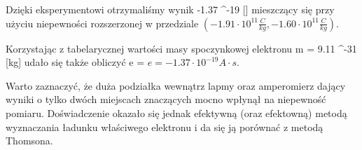 \documentclass{article}
\begin{document}
Dzięki eksperymentowi otrzymaliśmy wynik -1.37 ^{-19} [] mieszczący się przy użyciu niepewności rozszerzonej w przedziale $(-1.91 \cdot 10^{11} \frac{C}{kg}, -1.60 \cdot 10^{11} \frac{C}{kg})$. 

Korzystając z tabelarycznej wartości masy spoczynkowej elektronu m = 9.11 ^{-31} [kg] udało się także obliczyć e = $e = -1.37 \cdot 10^{-19} A \cdot s$.

Warto zaznaczyć, że duża podziałka wewnątrz lapmy oraz amperomierz dający wyniki o tylko dwóch miejscach znaczących mocno wpłynął na niepewność pomiaru. Doświadczenie okazało się jednak efektywną (oraz efektowną) metodą wyznaczania ładunku właściwego elektronu i da się ją porównać z metodą Thomsona.





\end{document}
